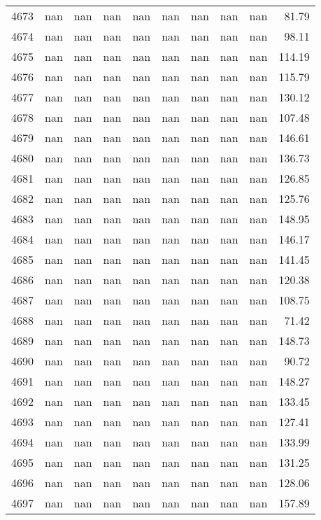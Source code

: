 \begin{tabular}{lrrrrrrrrr}
4673 & nan & nan & nan & nan & nan & nan & nan & nan & 81.79 \\
4674 & nan & nan & nan & nan & nan & nan & nan & nan & 98.11 \\
4675 & nan & nan & nan & nan & nan & nan & nan & nan & 114.19 \\
4676 & nan & nan & nan & nan & nan & nan & nan & nan & 115.79 \\
4677 & nan & nan & nan & nan & nan & nan & nan & nan & 130.12 \\
4678 & nan & nan & nan & nan & nan & nan & nan & nan & 107.48 \\
4679 & nan & nan & nan & nan & nan & nan & nan & nan & 146.61 \\
4680 & nan & nan & nan & nan & nan & nan & nan & nan & 136.73 \\
4681 & nan & nan & nan & nan & nan & nan & nan & nan & 126.85 \\
4682 & nan & nan & nan & nan & nan & nan & nan & nan & 125.76 \\
4683 & nan & nan & nan & nan & nan & nan & nan & nan & 148.95 \\
4684 & nan & nan & nan & nan & nan & nan & nan & nan & 146.17 \\
4685 & nan & nan & nan & nan & nan & nan & nan & nan & 141.45 \\
4686 & nan & nan & nan & nan & nan & nan & nan & nan & 120.38 \\
4687 & nan & nan & nan & nan & nan & nan & nan & nan & 108.75 \\
4688 & nan & nan & nan & nan & nan & nan & nan & nan & 71.42 \\
4689 & nan & nan & nan & nan & nan & nan & nan & nan & 148.73 \\
4690 & nan & nan & nan & nan & nan & nan & nan & nan & 90.72 \\
4691 & nan & nan & nan & nan & nan & nan & nan & nan & 148.27 \\
4692 & nan & nan & nan & nan & nan & nan & nan & nan & 133.45 \\
4693 & nan & nan & nan & nan & nan & nan & nan & nan & 127.41 \\
4694 & nan & nan & nan & nan & nan & nan & nan & nan & 133.99 \\
4695 & nan & nan & nan & nan & nan & nan & nan & nan & 131.25 \\
4696 & nan & nan & nan & nan & nan & nan & nan & nan & 128.06 \\
4697 & nan & nan & nan & nan & nan & nan & nan & nan & 157.89 \\

\end{tabular}

